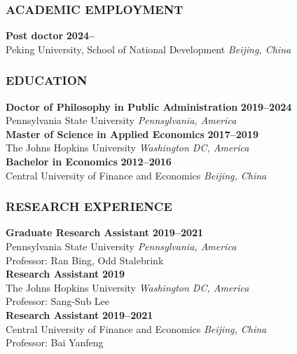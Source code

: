 








\subsubsection*{ACADEMIC EMPLOYMENT}
\textbf{Post doctor} \hfill \textbf{2024--} \\
Peking University, School of National Development \hfill \textit{Beijing, China}
\\[8pt]


\subsubsection*{EDUCATION}
\textbf{Doctor of Philosophy in Public Administration} \hfill \textbf{2019--2024} \\
Pennsylvania State University \hfill \textit{Pennsylvania, America}
\\[12pt]
\noindent \textbf{Master of Science in Applied Economics} \hfill \textbf{2017--2019} \\
The Johns Hopkins University \hfill \textit{Washington DC, America}
\\[12pt]
\noindent \textbf{Bachelor in Economics} \hfill \textbf{2012--2016} \\
Central University of Finance and Economics \hfill \textit{Beijing, China}
\\[8pt]


\subsubsection*{RESEARCH EXPERIENCE}
\noindent \textbf{Graduate Research Assistant} \hfill \textbf{2019--2021} \\
Pennsylvania State University \hfill \textit{Pennsylvania, America}\\
Professor: Ran Bing, Odd Stalebrink
\\[12pt]
\noindent \textbf{Research Assistant} \hfill \textbf{2019} \\
The Johns Hopkins University \hfill \textit{Washington DC, America}\\
Professor: Sang-Sub Lee
\\[12pt]
\noindent \textbf{Research Assistant} \hfill \textbf{2019--2021} \\
Central University of Finance and Economics \hfill \textit{Beijing, China}\\
Professor: Bai Yanfeng
\\[8pt]

